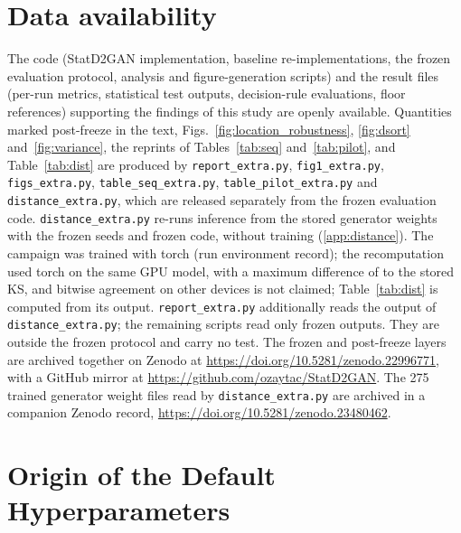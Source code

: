 \documentclass[preprint,12pt]{elsarticle}
\begin{document}
\section*{Data availability}

The code (StatD2GAN implementation, baseline re-implementations, the
frozen evaluation protocol, analysis and figure-generation scripts) and
the result files (per-run metrics, statistical test outputs,
decision-rule evaluations, floor references) supporting the
findings of this study are openly available.
Quantities marked post-freeze in the text, Figs.~\ref{fig:location_robustness},
\ref{fig:dsort} and~\ref{fig:variance}, the reprints of Tables~\ref{tab:seq} and~\ref{tab:pilot}, and
Table~\ref{tab:dist} are
produced by \texttt{report\_extra.py}, \texttt{fig1\_extra.py}, \texttt{figs\_extra.py},
\texttt{table\_seq\_extra.py}, \texttt{table\_pilot\_extra.py} and \texttt{distance\_extra.py}, which
are released separately from the frozen evaluation code.
\texttt{distance\_extra.py} re-runs inference from the stored generator
weights with the frozen seeds and frozen code, without training
(\ref{app:distance}). The campaign was trained with torch
\phTrainTorch{} (run environment record); the recomputation used torch \phDistTorch{} on
the same GPU model, with a maximum difference of \phDistGateMaxDiff{} to the
stored KS, and bitwise agreement on other devices is not claimed;
Table~\ref{tab:dist} is computed from its output.
\texttt{report\_extra.py} additionally reads the output of
\texttt{distance\_extra.py}; the remaining scripts read only frozen outputs. They are outside the frozen
protocol and carry no test.  The frozen and post-freeze layers are archived together on Zenodo
at \url{https://doi.org/10.5281/zenodo.22996771}, with a GitHub
mirror at \url{https://github.com/ozaytac/StatD2GAN}.
The 275 trained generator weight files read by \texttt{distance\_extra.py} are archived in a
companion Zenodo record, \url{https://doi.org/10.5281/zenodo.23480462}.



\appendix
\section{Origin of the Default Hyperparameters}
\label{app:sensitivity}
\end{document}
